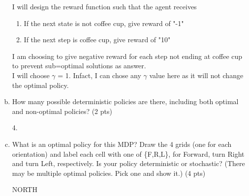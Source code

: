 \documentclass[12pt]{article}
\begin{document}
\begin{enumerate}[a)]
\begin{solution}
I will design the reward function such that the agent receives 
\begin{enumerate}
\item If the next state is not coffee cup, give reward of "-1"
\item If the next step is coffee cup, give reward of "10" 
\end{enumerate}

I am choosing to give negative reward for each step not ending at coffee cup to prevent sub=optimal solutions as answer. \\

I will choose $\gamma$ = 1. Infact, I can chose any $\gamma$ value here as it will not change the optimal policy.\\
\end{solution}

\item How many possible deterministic policies are there, including both optimal and non-optimal policies? (2 pts)

\begin{solution}
4. 
\end{solution}

\item What is an optimal policy for this MDP? Draw the 4 grids (one for each orientation) and label each cell with one of \{F,R,L\}, for Forward, turn Right and turn Left, respectively. Is your policy deterministic or stochastic? (There may be multiple optimal policies. Pick one and show it.) (4 pts)

\begin{solution}
\end{solution}
NORTH
\begin{figure}[h]
  \centering
\end{figure}
\end{enumerate}
\end{document}
